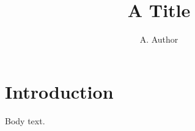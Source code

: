\documentclass{an}
\begin{document}
\title{A Title}
\author{A. Author}
\maketitle
\section{Introduction}
Body text.
\end{document}
